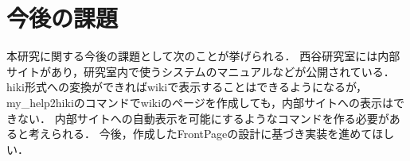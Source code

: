 \section{今後の課題}
本研究に関する今後の課題として次のことが挙げられる．
西谷研究室には内部サイトがあり，研究室内で使うシステムのマニュアルなどが公開されている．
hiki形式への変換ができればwikiで表示することはできるようになるが，
my\_help2hikiのコマンドでwikiのページを作成しても，内部サイトへの表示はできない．
内部サイトへの自動表示を可能にするようなコマンドを作る必要があると考えられる．
今後，作成したFrontPageの設計に基づき実装を進めてほしい．